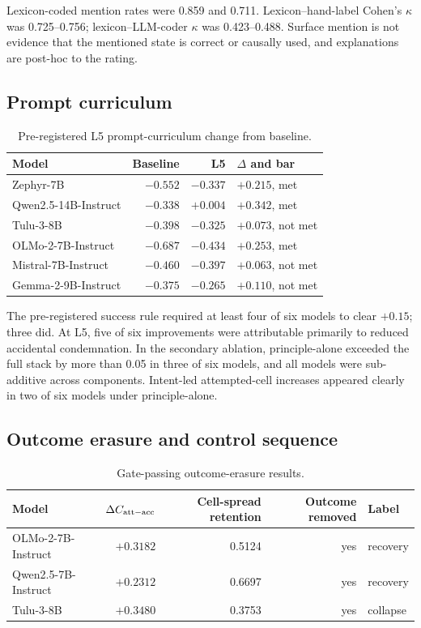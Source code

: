 Lexicon-coded mention rates were 0.859 and 0.711.
Lexicon--hand-label Cohen's $\kappa$ was 0.725--0.756; lexicon--LLM-coder $\kappa$ was 0.423--0.488.
Surface mention is not evidence that the mentioned state is correct or causally used, and explanations are post-hoc to the rating.

\subsection{Prompt curriculum}

\begin{table}[h]
\centering
\small
\caption{Pre-registered L5 prompt-curriculum change from baseline.}
\label{tab:curriculum}
\begin{tabular}{@{}lrrl@{}}
\toprule
Model & Baseline & L5 & $\Delta$ and bar \\
\midrule
Zephyr-7B & $-0.552$ & $-0.337$ & $+0.215$, met \\
Qwen2.5-14B-Instruct & $-0.338$ & $+0.004$ & $+0.342$, met \\
Tulu-3-8B & $-0.398$ & $-0.325$ & $+0.073$, not met \\
OLMo-2-7B-Instruct & $-0.687$ & $-0.434$ & $+0.253$, met \\
Mistral-7B-Instruct & $-0.460$ & $-0.397$ & $+0.063$, not met \\
Gemma-2-9B-Instruct & $-0.375$ & $-0.265$ & $+0.110$, not met \\
\bottomrule
\end{tabular}
\end{table}

The pre-registered success rule required at least four of six models to clear $+0.15$; three did.
At L5, five of six improvements were attributable primarily to reduced accidental condemnation.
In the secondary ablation, principle-alone exceeded the full stack by more than 0.05 in three of six models, and all models were sub-additive across components.
Intent-led attempted-cell increases appeared clearly in two of six models under principle-alone.

\subsection{Outcome erasure and control sequence}

\begin{table}[h]
\centering
\small
\caption{Gate-passing outcome-erasure results.}
\label{tab:erasure-summary}
\begin{tabular}{@{}lrrrl@{}}
\toprule
Model & $\Delta C_{\mathrm{att-acc}}$ & Cell-spread retention & Outcome removed & Label \\
\midrule
OLMo-2-7B-Instruct & $+0.3182$ & 0.5124 & yes & recovery \\
Qwen2.5-7B-Instruct & $+0.2312$ & 0.6697 & yes & recovery \\
Tulu-3-8B & $+0.3480$ & 0.3753 & yes & collapse \\
\bottomrule
\end{tabular}
\end{table}

